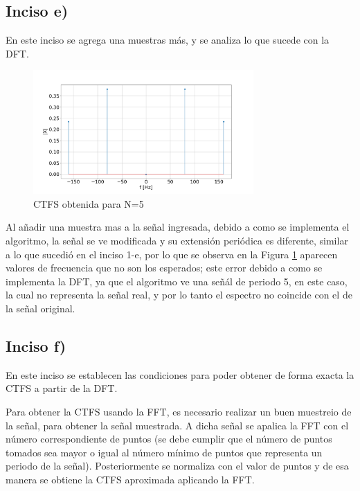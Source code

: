 \documentclass{article}
\begin{document}
    \subsection*{Inciso e)}

    En este inciso se agrega una muestras más, y se analiza lo que sucede con la DFT.

    \begin{figure}[H]
        \centering
        \includegraphics[width=0.75\textwidth]{Img/punto_2_e.png}
        \caption{CTFS obtenida para N=5}
        \label{fig.2e}
    \end{figure}

    Al añadir una muestra mas a la señal ingresada, debido a como se implementa el algoritmo, la señal se ve modificada y su 
    extensión periódica es diferente, similar a lo que sucedió en el inciso 1-e, por lo que se observa en la Figura \ref{fig.2e} aparecen valores de frecuencia que no son los esperados; este error debido a como se implementa la DFT, ya que el algoritmo ve una señál de periodo 5, en este caso, la cual no representa la señal real, y por lo tanto el espectro no coincide con el de la señal original.


    \subsection*{Inciso f)}

    En este inciso se establecen las condiciones para poder obtener de forma exacta la 
    CTFS a partir de la DFT.

    Para obtener la CTFS usando la FFT, es necesario realizar un buen muestreio de la señal, 
    para obtener la señal muestrada. A dicha señal se apalica la FFT con el número correspondiente
    de puntos (se debe cumplir que el número de puntos tomados sea mayor o igual al número mínimo de puntos que representa un periodo de la señal). 
    Posteriormente se normaliza con el valor de puntos 
    y de esa manera se obtiene la CTFS aproximada aplicando la FFT.
\end{document}
